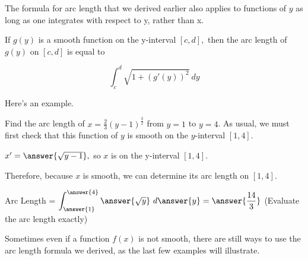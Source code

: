 \documentclass[handout,nooutcomes]{ximera}
\begin{document}
The formula for arc length that we derived earlier also applies to functions of $y$ as long as one integrates with respect to y, rather than x.

\begin{theorem}
If $g(y)$ is a smooth function on the y-interval $[c,d],$ then the arc length of $g(y)$ on $[c,d]$ is equal to

$$\displaystyle\int_{c}^{d} \sqrt{1+(g'(y))^2} \ dy$$

\end{theorem}

Here's an example.


\begin{problem}
Find the arc length of $x = \frac{2}{3} (y-1)^{\frac{3}{2}}$ from $y=1$ to $y=4$.  As usual, we must first check that this function of $y$ is smooth on the $y$-interval $[1,4]$.

$x' = \answer{\sqrt{y-1}},$ so $x$ is  on the y-interval $[1,4]$.

\begin{problem}
Therefore, because $x$ is smooth, we can determine its arc length on $[1,4]$.

Arc Length = $\displaystyle\int_{\answer{1}}^{\answer{4}} \answer{\sqrt{y}} \ d\answer{y} = \answer{\frac{14}{3}}$ (Evaluate the arc length exactly)

\end{problem}

\end{problem}

Sometimes even if a function $f(x)$ is not smooth, there are still ways to use the arc length formula we derived, as the last few examples will illustrate.

\end{document}
